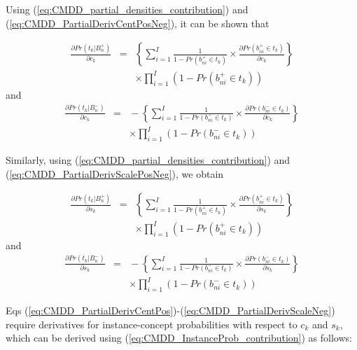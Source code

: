 \documentclass[12pt,dvips]{report}
\numberwithin{equation}{section}
\begin{document}
Using (\ref{eq:CMDD_partial_densities_contribution}) and (\ref{eq:CMDD_PartialDerivCentPosNeg}), it can be shown that

\begin{eqnarray} \label{eq:CMDD_PartialDerivCentPos}
\frac{\partial Pr(t_{k}\vert B_{n}^{+})}{\partial c_{k}}\!\!&=&\!\!\left\{ \sum_{i=1}^{I}\frac{1}{1-Pr(b_{ni}^{+}\in t_{k})}\times\frac{\partial Pr(b_{ni}^{+}\in t_{k})}{\partial c_{k}}\right\}  \nonumber \\
                                                   &  & \times \prod_{i=1}^{I}(1-Pr(b_{ni}^{+}\in t_{k}))  
\end{eqnarray}
and
\begin{eqnarray} \label{eq:CMDD_PartialDerivCentNeg}
\frac{\partial Pr(t_{k}\vert B_{n}^{-})}{\partial c_{k}}\!\!\!&\!=\!&\!\!\! -\left\{ \sum_{i=1}^{I}\frac{1}{1-Pr(b_{ni}^{-}\in t_{k})}\times\frac{\partial Pr(b_{ni}^{-}\in t_{k})}{\partial c_{k}}\right\}   \nonumber \\
 				                      &  & \times \prod_{i=1}^{I}(1-Pr(b_{ni}^{-}\in t_{k})) 
\end{eqnarray}

Similarly, using (\ref{eq:CMDD_partial_densities_contribution}) and (\ref{eq:CMDD_PartialDerivScalePosNeg}), we obtain

\begin{eqnarray} \label{eq:CMDD_PartialDerivScalePos}
\frac{\partial Pr(t_{k}\vert B_{n}^{+})}{\partial s_{k}}\!\!&=&\!\!\left\{ \sum_{i=1}^{I}\frac{1}{1-Pr(b_{ni}^{+}\in t_{k})}\times\frac{\partial Pr(b_{ni}^{+}\in t_{k})}{\partial s_{k}}\right\}  \nonumber \\
                                                   &  & \times \prod_{i=1}^{I}(1-Pr(b_{ni}^{+}\in t_{k}))  
\end{eqnarray}
and
\begin{eqnarray} \label{eq:CMDD_PartialDerivScaleNeg}
\frac{\partial Pr(t_{k}\vert B_{n}^{-})}{\partial s_{k}}\!\!\!&\!=\!&\!\!\! -\left\{ \sum_{i=1}^{I}\frac{1}{1-Pr(b_{ni}^{-}\in t_{k})}\times\frac{\partial Pr(b_{ni}^{-}\in t_{k})}{\partial s_{k}}\right\}   \nonumber \\
 				                      &  & \times \prod_{i=1}^{I}(1-Pr(b_{ni}^{-}\in t_{k})) 
\end{eqnarray}

Eqs (\ref{eq:CMDD_PartialDerivCentPos})-(\ref{eq:CMDD_PartialDerivScaleNeg}) require derivatives for instance-concept probabilities with respect to $c_{k}$ and $s_{k}$, which can be derived using (\ref{eq:CMDD_InstanceProb_contribution}) as follows:
\end{document}
